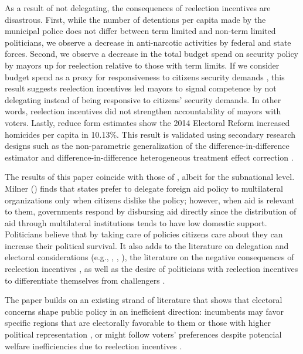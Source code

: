 \documentclass[12pt]{amsart}
\numberwithin{equation}{section}
\theoremstyle{definition}
\theoremstyle{definition}
\theoremstyle{definition}
\begin{document}
As a result of not delegating, the consequences of reelection incentives are disastrous. First, while the number of detentions per capita made by the municipal police does not differ between term limited and non-term limited politicians, we observe a decrease in anti-narcotic activities by federal and state forces. Second, we observe a decrease in the total budget spend on security policy by mayors up for reelection relative to those with term limits. If we consider budget spend as a proxy for responsiveness to citizens security demands \citep{carreri_2020}, this result suggests reelection incentives led mayors to signal competence by not delegating instead of being responsive to citizens' security demands. In other words, reelection incentives did not strengthen accountability of mayors with voters. Lastly, reduce form estimates show the 2014 Electoral Reform increased homicides per capita in 10.13\%. This result is validated using secondary research designs such as the non-parametric generalization of the difference-in-difference estimator \citep{imai_etal_2020} and difference-in-difference heterogeneous treatment effect correction \citep{chaisemarting_etal_2019}.       

   
The results of this paper coincide with those of \citet{milner_2004}, albeit for the subnational level. Milner (\citeyear{milner_2004}) finds that states prefer to delegate foreign aid policy to multilateral organizations only when citizens dislike the policy; however, when aid is relevant to them, governments respond by disbursing aid directly since the distribution of aid through multilateral institutions tends to have low domestic support. Politicians believe that by taking care of policies citizens care about they can increase their political survival. It also adds to the literature on delegation and electoral considerations (e.g., \citet{mccubbins_1991}, \citet{fiorina_1982}, \citet{loftis_2014}), the literature on the negative consequences of reelection incentives \citep{coviello_etal_2017}, as well as the desire of politicians with reelection incentives to differentiate themselves from challengers \citep{motolinia_2020}.             

The paper builds on an existing strand of literature that shows that electoral concerns shape public policy in an inefficient direction: incumbents may favor specific regions that are electorally favorable to them \citep{schady_2000, Miguel_zaidi_2003, cole_2004, khemani_2007} or those with higher political representation  \citep{wright_1974, porto_2001, ansolabehere_etal_2002}, or might follow voters’ preferences despite potencial welfare inefficiencies due to reelection incentives \citep{pulejo_querubin_2021}.  
\end{document}
